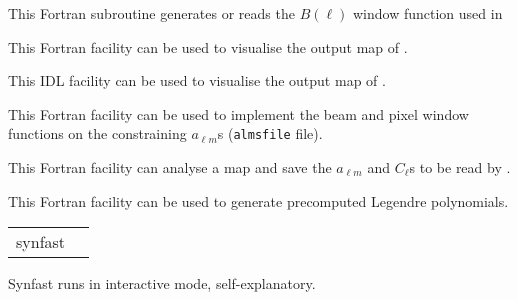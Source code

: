 \begin{support}
  \begin{sulist}{} %
  \item[\htmlref{generate\_beam}{sub:generate_beam}] This \healpix Fortran
subroutine generates or reads the $B(\ell)$ window function used in \thedocid
  \item[\htmlref{map2gif}{fac:map2gif}] This \healpix Fortran facility can be used to visualise the
  output map of \thedocid.
  \item[\htmlref{mollview}{idl:mollview}] This \healpix IDL facility can be used to visualise the
  output map of \thedocid.
  \item[\htmlref{alteralm}{fac:alteralm}] This \healpix Fortran facility can be
  used to implement the beam and pixel window functions on the constraining
  $a_{\ell m}$s ({\tt almsfile} file).
  \item[\htmlref{anafast}{fac:anafast}] This \healpix Fortran facility can analyse a \healpix map and 
     	       save the $a_{\ell m}$ and $C_{\ell}$s to be read by \thedocid.
  \item[\htmlref{plmgen}{fac:plmgen}] This \healpix Fortran facility can be used to generate precomputed Legendre polynomials.
		
  \end{sulist}
\end{support}

\begin{examples}{1}
{
\begin{tabular}{ll} %
synfast  \\
\end{tabular}
}
{
Synfast runs in interactive mode, self-explanatory.
}
\end{examples}

\vfill\newpage

